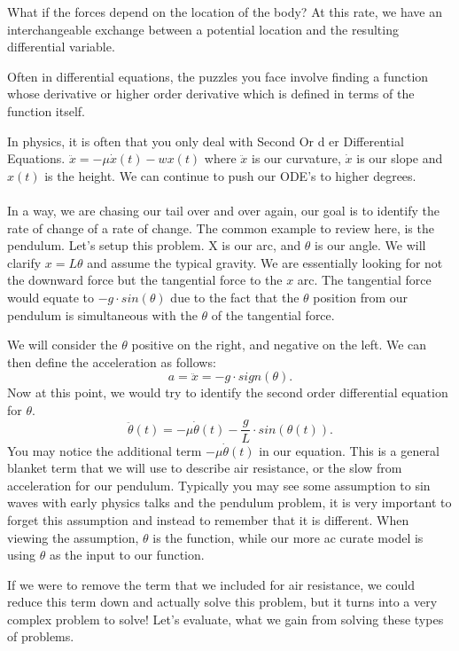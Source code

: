 \documentclass[10pt, oneside]{report}
\begin{document}
What if the forces depend on the location of the body? At this rate, we have an interchangeable exchange between a potential location and the resulting differential variable.  

Often in differential equations, the puzzles you face involve finding a function whose derivative or higher order derivative which is defined in terms of the function itself. 

In physics, it is often that you only deal with Second Or d er Differential Equations. $\ddot{x} = -\mu\dot{x}(t) - wx(t)$ where $\ddot{x}$ is our curvature, $\dot{x}$ is our slope and $x(t)$ is the height. We can continue to push our ODE's to higher degrees. 
\\
\\
In a way, we are chasing our tail over and over again, our goal is to identify the rate of change of a rate of change.  The common example to review here, is the pendulum.  Let's setup this problem.  X is our arc, and $\theta$ is our angle.  We will clarify $x = L\theta$ and assume the typical gravity.  We are essentially looking for not the downward force but the tangential force to the $x$ arc. The tangential force would equate to $-g\cdot sin(\theta)$ due to the fact that the $\theta$ position from our pendulum is simultaneous with the $\theta$ of the tangential force.

We will consider the $\theta$ positive on the right, and negative on the left.  We can then define the acceleration as follows:
\[
    a = \ddot{x} = -g \cdot sign(\theta)
.\] 
Now at this point, we would try to identify the second order differential equation for $\theta$. 
\[
    \ddot{\theta}(t) = -\mu\dot{\theta}(t) - \frac{g}{L} \cdot sin(\theta(t))
.\] 
You may notice the additional term $-\mu\dot{\theta}(t)$ in our equation.  This is a general blanket term that we will use to describe air resistance, or the slow from acceleration for our pendulum.  Typically you may see some assumption to sin waves with early physics talks and the pendulum problem, it is very important to forget this assumption and instead to remember that it is different.  When viewing the assumption, $\theta$ is the function, while our more ac curate model is using $\theta$ as the input to our function.  

If we were to remove the term that we included for air resistance, we could reduce this term down and actually solve this problem, but it turns into a very complex problem to solve! Let's evaluate, what we gain from solving these types of problems.
\end{document}
